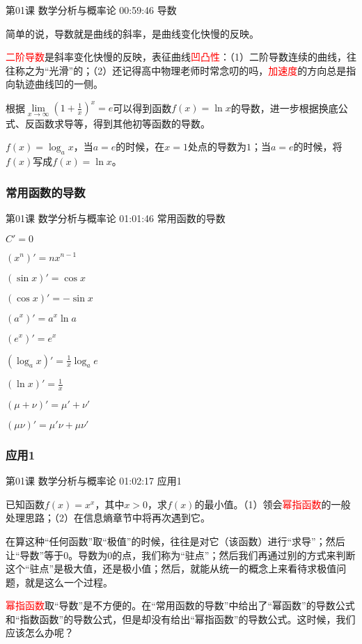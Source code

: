 \documentclass[UTF8]{ctexart}
\begin{document}
第01课 数学分析与概率论 00:59:46 导数

简单的说，导数就是曲线的斜率，是曲线变化快慢的反映。

\textcolor{red}{二阶导数}是斜率变化快慢的反映，表征曲线\textcolor{red}{凹凸性}：（1）二阶导数连续的曲线，往往称之为“光滑”的；（2）还记得高中物理老师时常念叨的吗，\textcolor{red}{加速度}的方向总是指向轨迹曲线凹的一侧。

根据$\underset{x \rightarrow \infty}{\lim} \left (  1+\frac{1}{x} \right )^{x}=e$可以得到函数$f(x)=\ln x$的导数，进一步根据换底公式、反函数求导等，得到其他初等函数的导数。

$f(x)=\log _{a}x$，当$a=e$的时候，在$x=1$处点的导数为$1$；当$a=e$的时候，将$f(x)$写成$f(x)=\ln x$。

\subsubsection{常用函数的导数}

第01课 数学分析与概率论 01:01:46 常用函数的导数

$C'=0$

$(x^{n})'=nx^{n-1}$

$(\sin x)'=\cos x$

$(\cos x)'=-\sin x$

$(a^{x})'=a^{x}\ln a$

$(e^{x})'=e^{x}$

$(\log_{a}{x})'=\frac{1}{x}\log_{a}{e}$

$(\ln x)'=\frac{1}{x}$

$(\mu+\nu)'=\mu'+\nu'$

$(\mu\nu)'=\mu'\nu+\mu\nu'$

\subsubsection{应用1}

第01课 数学分析与概率论 01:02:17 应用1

已知函数$f(x)=x^{x}$，其中$x>0$，求$f(x)$的最小值。（1）领会\textcolor{red}{幂指函数}的一般处理思路；（2）在信息熵章节中将再次遇到它。



在算这种“任何函数”取“极值”的时候，往往是对它（该函数）进行“求导”；然后让“导数”等于0。导数为0的点，我们称为“驻点”；然后我们再通过别的方式来判断这个“驻点”是极大值，还是极小值；然后，就能从统一的概念上来看待求极值问题，就是这么一个过程。

\textcolor{red}{幂指函数}取“导数”是不方便的。在“常用函数的导数”中给出了“幂函数”的导数公式和“指数函数”的导数公式，但是却没有给出“幂指函数”的导数公式。这时候，我们应该怎么办呢？
\end{document}
